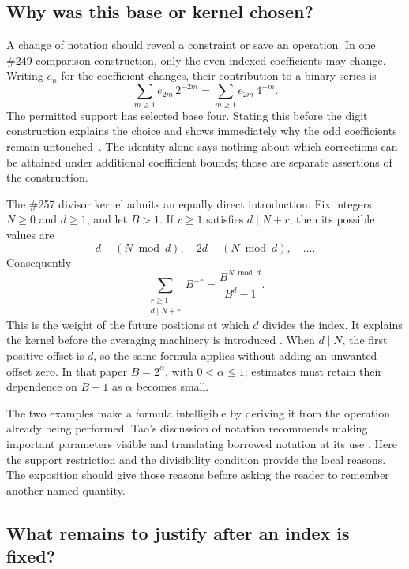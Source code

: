\subsection{Why was this base or kernel chosen?}\label{sec:formula-choice}

A change of notation should reveal a constraint or save an operation. In one
\#249 comparison construction, only the even-indexed coefficients may change.
Writing $e_n$ for the coefficient changes, their contribution to a binary series is
\[
                 \sum_{m\ge1} e_{2m}\,2^{-2m}
                 =\sum_{m\ge1}e_{2m}\,4^{-m}.
\]
The permitted support has selected base four. Stating this before the digit
construction explains the choice and shows immediately why the odd coefficients
remain untouched~\cite[comparison-sequence construction]{paper249long}.
The identity alone says nothing about which corrections can be attained under
additional coefficient bounds; those are separate assertions of the construction.

The \#257 divisor kernel admits an equally direct introduction. Fix integers
$N\ge0$ and $d\ge1$, and let $B>1$. If $r\ge1$ satisfies $d\mid N+r$,
then its possible values are
\[
       d-(N\bmod d),\quad 2d-(N\bmod d),\quad\ldots.
\]
Consequently
\[
 \sum_{\substack{r\ge1\\d\mid N+r}}B^{-r}
 =\frac{B^{N\bmod d}}{B^d-1}.
\]
This is the weight of the future positions at which $d$ divides the index.
It explains the kernel before the averaging machinery is introduced
\cite[finite means for shifted divisor tails]{paper257}. When $d\mid N$, the
first positive offset is $d$, so the same formula applies without adding an
unwanted offset zero. In that paper $B=2^\alpha$, with $0<\alpha\le1$; estimates
must retain their dependence on $B-1$ as $\alpha$ becomes small.

The two examples make a formula intelligible by deriving it from the operation
already being performed. Tao's discussion of notation recommends making
important parameters visible and translating borrowed notation at its use
\cite{tao-notation}. Here the support restriction and the divisibility condition
provide the local reasons. The exposition should give those reasons before
asking the reader to remember another named quantity.

\subsection{What remains to justify after an index is fixed?}\label{sec:fixed-partition}

